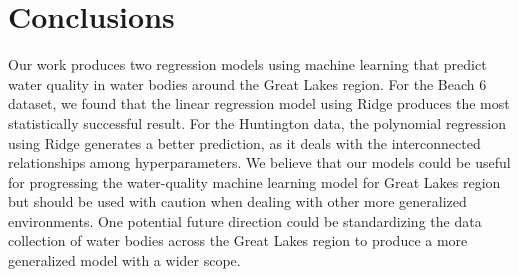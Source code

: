 
\section{Conclusions}
\label{sec:concl}

Our work produces two regression models using machine learning that predict water quality in water bodies around the Great Lakes region. For the Beach 6 dataset, we found that the linear regression model using Ridge produces the most statistically successful result. For the Huntington data, the polynomial regression using Ridge generates a better prediction, as it deals with the interconnected relationships among hyperparameters. We believe that our models could be useful for progressing the water-quality machine learning model for Great Lakes region but should be used with caution when dealing with other more generalized environments. One potential future direction could be standardizing the data collection of water bodies across the Great Lakes region to produce a more generalized model with a wider scope.